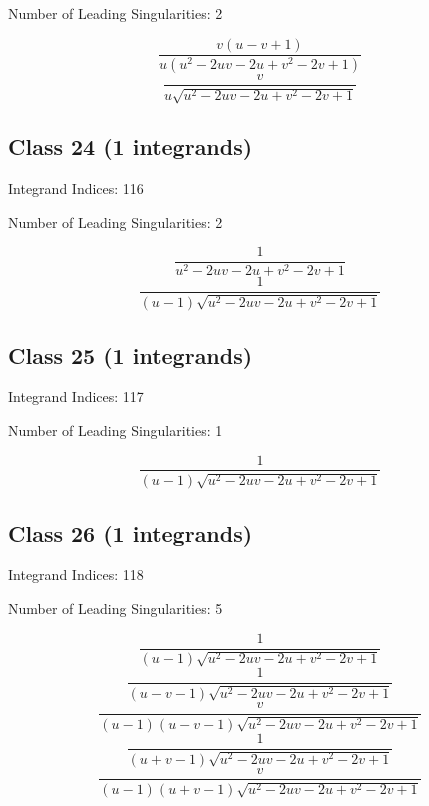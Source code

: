 \documentclass[11pt,a4paper]{article}
\begin{document}
Number of Leading Singularities: 2

\begin{equation}
\frac{v (u-v+1)}{u \left(u^2-2 u v-2 u+v^2-2 v+1\right)}
\end{equation}
\begin{equation}
\frac{v}{u \sqrt{u^2-2 u v-2 u+v^2-2 v+1}}
\end{equation}


\subsection*{Class 24 (1 integrands)}
Integrand Indices: 116

Number of Leading Singularities: 2

\begin{equation}
\frac{1}{u^2-2 u v-2 u+v^2-2 v+1}
\end{equation}
\begin{equation}
\frac{1}{(u-1) \sqrt{u^2-2 u v-2 u+v^2-2 v+1}}
\end{equation}


\subsection*{Class 25 (1 integrands)}
Integrand Indices: 117

Number of Leading Singularities: 1

\begin{equation}
\frac{1}{(u-1) \sqrt{u^2-2 u v-2 u+v^2-2 v+1}}
\end{equation}


\subsection*{Class 26 (1 integrands)}
Integrand Indices: 118

Number of Leading Singularities: 5

\begin{equation}
\frac{1}{(u-1) \sqrt{u^2-2 u v-2 u+v^2-2 v+1}}
\end{equation}
\begin{equation}
\frac{1}{(u-v-1) \sqrt{u^2-2 u v-2 u+v^2-2 v+1}}
\end{equation}
\begin{equation}
\frac{v}{(u-1) (u-v-1) \sqrt{u^2-2 u v-2 u+v^2-2 v+1}}
\end{equation}
\begin{equation}
\frac{1}{(u+v-1) \sqrt{u^2-2 u v-2 u+v^2-2 v+1}}
\end{equation}
\begin{equation}
\frac{v}{(u-1) (u+v-1) \sqrt{u^2-2 u v-2 u+v^2-2 v+1}}
\end{equation}
\end{document}
